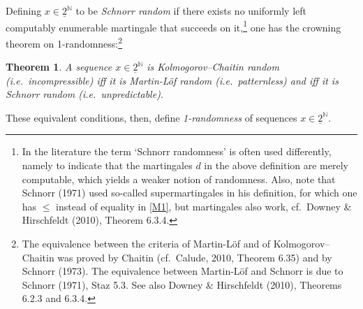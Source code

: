 \documentclass[11pt,a4paper]{article}
\numberwithin{equation}{section}
\newcommand{\er}{\eqref}
\newcommand{\ul}{\underline}
\newcommand{\N}{{\mathbb N}} \newcommand{\R}{{\mathbb R}}
\newtheorem{theorem}[definition]{Theorem}
\begin{document}
Defining $x\in \ul{2}^{\N}$ to be \emph{Schnorr random} if there exists no uniformly left computably enumerable martingale that succeeds on it,\footnote{In the literature the term `Schnorr randomness' is often used differently, namely to indicate that the martingales $d$ in the above definition are merely computable, which yields a weaker notion of randomness. Also, note that Schnorr (1971) used so-called supermartingales in his definition, for which one has $\leq$ instead of equality in \er{M1}, but martingales also work, cf.\ Downey \& Hirschfeldt (2010), Theorem 6.3.4. 
} one has the crowning theorem on 1-randomness:\footnote{The equivalence between the criteria of Martin-L\"{o}f  and of 
Kolmogorov--Chaitin was proved by Chaitin (cf.\ Calude, 2010, Theorem 6.35) and by Schnorr (1973). The equivalence between  Martin-L\"{o}f  and Schnorr is due to Schnorr (1971), Staz 5.3. 
See also
 Downey \& Hirschfeldt (2010), Theorems 6.2.3 and 6.3.4.  }
 \begin{theorem}
 A  sequence $x\in \ul{2}^{\N}$ is Kolmogorov--Chaitin random (i.e.\ incompressible) 
  iff it is Martin-L\"{o}f random (i.e.\ patternless) and iff it is Schnorr random (i.e.\ unpredictable). 
   \end{theorem}
   These equivalent conditions, then, define \emph{1-randomness} of sequences $x\in \ul{2}^{\N}$.
\end{document}
